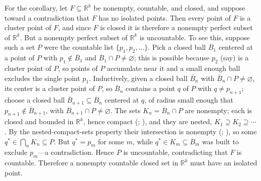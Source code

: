 \documentclass[main.tex]{subfiles}
\begin{document}
\begin{SolutionBlue}
For the corollary, let $F\subseteq\mathbb R^k$ be nonempty, countable, and closed, and suppose toward a
contradiction that $F$ has no isolated points. Then every point of $F$ is a cluster point of $F$, and
since $F$ is closed it is therefore a nonempty perfect subset of $\mathbb R^k$. But a nonempty perfect
subset of $\mathbb R^k$ is uncountable. To see this, suppose such a set $P$ were the countable list
$\{p_1,p_2,\dots\}$. Pick a closed ball $\overline B_1$ centered at a point of $P$ with $p_1\notin\overline
B_1$ and $\overline B_1\cap P\neq\varnothing$; this is possible because $p_2$ (say) is a cluster point of
$P$, so points of $P$ accumulate near it and a small enough ball excludes the single point $p_1$.
Inductively, given a closed ball $\overline B_n$ with $\overline B_n\cap P\neq\varnothing$, its center is a
cluster point of $P$, so $\overline B_n$ contains a point $q$ of $P$ with $q\neq p_{n+1}$; choose a closed
ball $\overline B_{n+1}\subseteq \overline B_n$ centered at $q$, of radius small enough that
$p_{n+1}\notin\overline B_{n+1}$, with $\overline B_{n+1}\cap P\neq\varnothing$. The sets
$K_n=\overline B_n\cap P$ are nonempty; each is closed and bounded in $\mathbb R^k$, hence compact
(; ), and they are nested,
$K_1\supseteq K_2\supseteq\cdots$. By the nested-compact-sets property their intersection is nonempty
(; ), so some $q^\ast\in\bigcap_n K_n\subseteq P$.
But $q^\ast=p_m$ for some $m$, while $q^\ast\in K_m\subseteq\overline B_m$ was built to exclude $p_m$---a
contradiction. Hence $P$ is uncountable, contradicting that $F$ is countable. Therefore a nonempty
countable closed set in $\mathbb R^k$ must have an isolated point.
\end{SolutionBlue}
\end{document}
